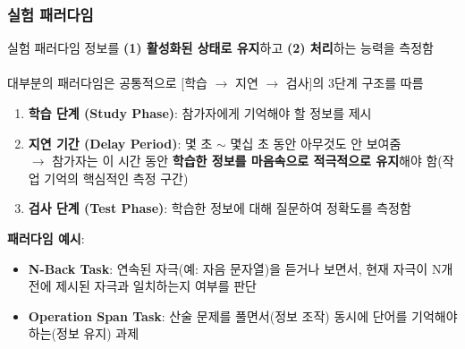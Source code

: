 \documentclass{beamer}
\begin{document}
\subsubsection{실험 패러다임}
\begin{frame}{실험 패러다임}
  정보를 \textbf{(1) 활성화된 상태로 유지}하고 \textbf{(2) 처리}하는 능력을 측정함\\~\\
  대부분의 패러다임은 공통적으로 [학습 $\rightarrow$ 지연 $\rightarrow$ 검사]의 3단계 구조를 따름
  \begin{enumerate}
    \item \textbf{학습 단계 (Study Phase)}: 참가자에게 기억해야 할 정보를 제시
    \item \textbf{지연 기간 (Delay Period)}: 몇 초 $\sim$ 몇십 초 동안 아무것도 안 보여줌\\
      $\rightarrow$ 참가자는 이 시간 동안 \textbf{학습한 정보를 마음속으로 적극적으로 유지}해야 함(작업 기억의 핵심적인 측정 구간)
    \item \textbf{검사 단계 (Test Phase)}: 학습한 정보에 대해 질문하여 정확도를 측정함
  \end{enumerate}

  \vspace{0.5em}
  \textbf{패러다임 예시}:
  \vspace{-0.5em}
  \begin{itemize}
    \item \textbf{N-Back Task}: 연속된 자극(예: 자음 문자열)을 듣거나 보면서, 현재 자극이 N개 전에 제시된 자극과 일치하는지 여부를 판단
    \item \textbf{Operation Span Task}: 산술 문제를 풀면서(정보 조작) 동시에 단어를 기억해야하는(정보 유지) 과제
  \end{itemize}
\end{frame}
\end{document}
